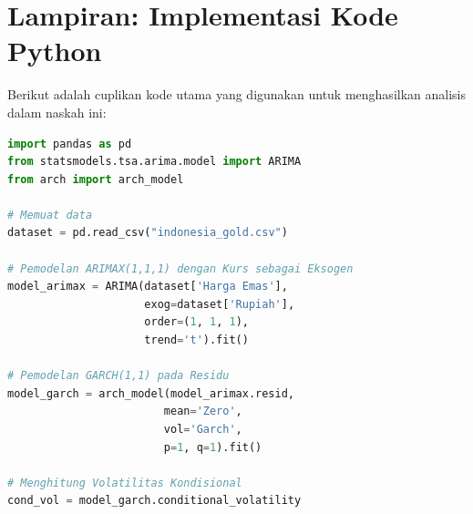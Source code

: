 \documentclass[12pt, a4paper]{article}
\begin{document}
\newpage
\appendix
\section{Lampiran: Implementasi Kode Python}
Berikut adalah cuplikan kode utama yang digunakan untuk menghasilkan analisis dalam naskah ini:

\begin{lstlisting}[language=Python, caption=Implementasi ARIMAX dan GARCH]
import pandas as pd
from statsmodels.tsa.arima.model import ARIMA
from arch import arch_model

# Memuat data
dataset = pd.read_csv("indonesia_gold.csv")

# Pemodelan ARIMAX(1,1,1) dengan Kurs sebagai Eksogen
model_arimax = ARIMA(dataset['Harga Emas'], 
                     exog=dataset['Rupiah'], 
                     order=(1, 1, 1), 
                     trend='t').fit()

# Pemodelan GARCH(1,1) pada Residu
model_garch = arch_model(model_arimax.resid, 
                        mean='Zero', 
                        vol='Garch', 
                        p=1, q=1).fit()

# Menghitung Volatilitas Kondisional
cond_vol = model_garch.conditional_volatility
\end{lstlisting}
\end{document}
